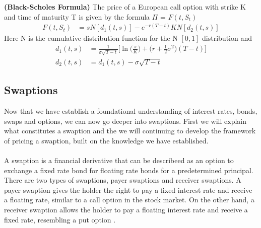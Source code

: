 \begin{proposition}
    \textbf{(Black-Scholes Formula)} The price of a European call option with strike K and time of maturity T 
    is given by the formula $\Pi$ = $F(t,S_t)$
    \begin{align*}
        F(t,S_t) & =s N[d_1(t,s)] -e^{-r(T-t)}KN[d_2(t,s)] 
    \end{align*}
    Here N is the cumulative distribution function for the N $[0,1]$ distribution and 
    \begin{align*}
        d_1(t,s) &= \frac{1}{\sigma \sqrt{T-t}} \Big[ \ln \Big(\frac{s}{K} \Big) +  \Big(r + \frac{1}{2} \sigma^2)(T-t)  \Big] \\
        d_2(t,s) &= d_1(t,s)-\sigma \sqrt{T-t}
    \end{align*}
    \label{Black-Scholes Formula}
    \cite{Bjork}
\end{proposition}
\subsection{Swaptions}
Now that we have establish a foundational understanding of interest rates, bonds, swaps and options, we can
now go deeper into swaptions. First we will explain what constitutes a swaption and the we will continuing 
to develop the framework of pricing a swaption, built on the knowledge we have established.  
\\\\
A swaption is a financial derivative that can be describeed as an option to exchange a fixed rate bond for
floating rate bonds for a predetermined principal. 
There are two types of swaptions, payer swaptions and receiver swaptions.
A payer swaption gives the holder the right to pay a fixed interest rate and receive a floating rate, 
similar to a call option in the stock market. On the other hand, a receiver swaption allows the holder
to pay a floating interest rate and receive a fixed rate, resembling a put option \cite{Lindstrom} .

